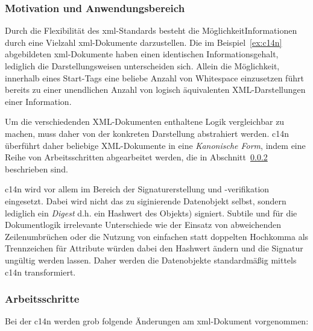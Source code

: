 \subsubsection{Motivation und Anwendungsbereich}
\label{sec:c14nscope}

Durch die Flexibilität des \acrshort{xml}-Standards besteht die MöglichkeitInformationen durch eine Vielzahl \acrshort{xml}-Dokumente darzustellen.\cite{siddiqui2002c14n} Die im Beispiel~\ref{ex:c14n} abgebildeten \acrshort{xml}-Dokumente haben einen identischen Informationsgehalt, lediglich die Darstellungsweisen unterscheiden sich. Allein die Möglichkeit, innerhalb eines Start-Tags eine beliebe Anzahl von Whitespace einzusetzen\cite[Produktionsregeln 3 und 40]{maler2008xml} führt bereits zu einer unendlichen Anzahl von logisch äquivalenten XML-Darstellungen einer Information.

Um die verschiedenden XML-Dokumenten enthaltene Logik vergleichbar zu machen, muss daher von der konkreten Darstellung abstrahiert werden. \acrlong{c14n} überführt daher beliebige XML-Dokumente in eine \emph{Kanonische Form}, indem eine Reihe von Arbeitsschritten abgearbeitet werden, die in Abschnitt~\ref{sec:c14nsteps} beschrieben sind.

\acrlong{c14n} wird vor allem im Bereich der Signaturerstellung und -verifikation eingesetzt. Dabei wird nicht das zu siginierende Datenobjekt selbst, sondern lediglich ein \emph{Digest} d.h. ein Hashwert des Objekts) signiert.\cite[Abschnitt 2.0]{bartel2008xmlsig} Subtile und für die Dokumentlogik irrelevante Unterschiede wie der Einsatz von abweichenden Zeilenumbrüchen oder die Nutzung von einfachen statt doppelten Hochkomma als Trennzeichen für Attribute würden dabei den Hashwert ändern und die Signatur ungültig werden lassen. Daher werden die Datenobjekte standardmäßig mittels \acrlong{c14n} transformiert.\cite[Abschnitt 4.3.3.2]{bartel2008xmlsig}

\subsubsection{Arbeitsschritte}
\label{sec:c14nsteps}

Bei der \acrlong{c14n} werden grob folgende Änderungen am
\acrshort{xml}-Dokument vorgenommen\cite[Abschnitt 1.1]{boyer2001c14n}:

